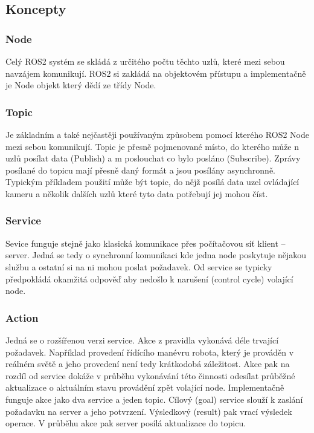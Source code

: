 \subsection*{Koncepty}


\subsubsection*{Node} %
Celý ROS2 systém se skládá z určitého počtu těchto uzlů, které mezi sebou navzájem komunikují. ROS2 si zakládá na objektovém přístupu a implementačně je Node objekt který dědí ze třídy Node. 

\subsubsection*{Topic}
Je základním a také nejčastěji používaným způsobem pomocí kterého ROS2 Node mezi sebou komunikují. Topic je přesně pojmenované místo, do kterého může n uzlů posílat data (Publish) a m poslouchat co bylo posláno (Subscribe). Zprávy posílané do topicu mají přesně daný formát a jsou posílány asynchronně. Typickým příkladem použití může být topic, do nějž posílá data uzel ovládající kameru a několik dalších uzlů které tyto data potřebují jej mohou číst. \cite{ros2_introduction}

\subsubsection*{Service}
Sevice funguje stejně jako klasická komunikace přes počítačovou síť klient -- server. Jedná se tedy o synchronní komunikaci kde jedna node poskytuje nějakou službu a ostatní si na ni mohou poslat požadavek. Od service se typicky předpokládá okamžitá odpověď aby nedošlo k narušení (control cycle) volající node. \cite{ros2_introduction}


\subsubsection*{Action} %
Jedná se o rozšířenou verzi service. Akce z pravidla vykonává déle trvající požadavek. Například provedení řídícího manévru robota, který je prováděn v reálném světě a jeho provedení není tedy krátkodobá záležitost. Akce pak na rozdíl od service dokáže v průběhu vykonávání této činnosti odesílat průběžné aktualizace o aktuálním stavu provádění zpět volající node. Implementačně funguje akce jako dva service a jeden topic. Cílový (goal) service slouží k zaslání požadavku na server a jeho potvrzení. Výsledkový (result) pak vrací výsledek operace. V průběhu akce pak server posílá aktualizace do topicu.

